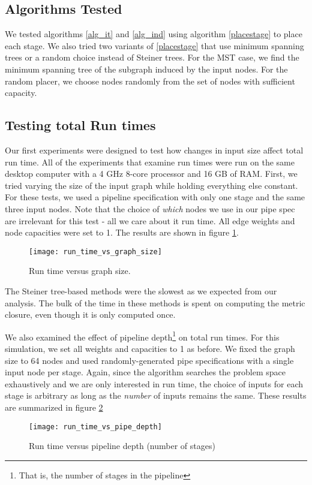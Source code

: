 \documentclass[conference]{IEEEtran}
\begin{document}
	\subsection{Algorithms Tested}
	We tested algorithms \ref{alg_it} and \ref{alg_ind} using algorithm \ref{placestage} to place each stage. We also tried two variants of \ref{placestage} that use minimum spanning trees or a random choice instead of Steiner trees. For the MST case, we find the minimum spanning tree of the subgraph induced by the input nodes. For the random placer, we choose nodes randomly from the set of nodes with sufficient capacity.
	
	\subsection{Testing total Run times}
	Our first experiments were designed to test how changes in input size affect total run time. All of the experiments that examine run times were run on the same desktop computer with a 4 GHz 8-core processor and 16 GB of RAM. First, we tried varying the size of the input graph while holding everything else constant. For these tests, we used a pipeline specification with only one stage and the same three input nodes. Note that the choice of \textit{which} nodes we use in our pipe spec are irrelevant for this test - all we care about it run time. All edge weights and node capacities were set to 1. The results are shown in figure \ref{fig:rt_gs}.
	\begin{figure}[t]
	    \centering
	    \texttt{[image: run\_time\_vs\_graph\_size]}
	    \caption{Run time versus graph size.}
	    \label{fig:rt_gs}
	\end{figure}
	
	The Steiner tree-based methods were the slowest as we expected from our analysis. The bulk of the time in these methods is spent on computing the metric closure, even though it is only computed once. 
	
	We also examined the effect of pipeline depth\footnote{That is, the number of stages in the pipeline} on total run times. For this simulation, we set all weights and capacities to 1 as before. We fixed the graph size to 64 nodes and used randomly-generated pipe specifications with a single input node per stage. Again, since the algorithm searches the problem space exhaustively and we are only interested in run time, the choice of inputs for each stage is arbitrary as long as the \textit{number} of inputs remains the same. These results are summarized in figure \ref{fig:pd_gs}
	\begin{figure}[t]
	    \centering
	    \texttt{[image: run\_time\_vs\_pipe\_depth]}
	    \caption{Run time versus pipeline depth (number of stages)}
	    \label{fig:pd_gs}
	\end{figure}
	
\end{document}
